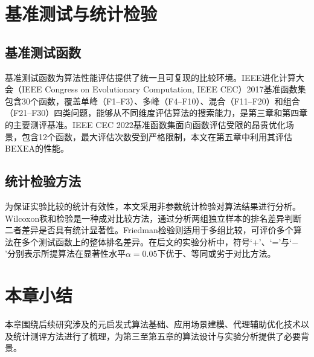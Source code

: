 \section{基准测试与统计检验}

\subsection{基准测试函数}

基准测试函数为算法性能评估提供了统一且可复现的比较环境\cite{ibsa_ref4}。IEEE进化计算大会（IEEE Congress on Evolutionary Computation, IEEE CEC）2017基准函数集包含30个函数，覆盖单峰（F1--F3）、多峰（F4--F10）、混合（F11--F20）和组合（F21--F30）四类问题\cite{ibsa_ref88}，能够从不同维度评估算法的搜索能力，是第三章和第四章的主要测评基准。IEEE CEC 2022基准函数集面向函数评估受限的昂贵优化场景，包含12个函数\cite{kumar2024optimization}，最大评估次数受到严格限制，本文在第五章中利用其评估BEXEA的性能。

\subsection{统计检验方法}
\label{sec:ch2_stat_tests}

为保证实验比较的统计有效性，本文采用非参数统计检验对算法结果进行分析。Wilcoxon秩和检验\cite{ibsa_ref95}是一种成对比较方法，通过分析两组独立样本的排名差异判断二者差异是否具有统计显著性。Friedman检验\cite{derrac2011practical}则适用于多组比较，可评价多个算法在多个测试函数上的整体排名差异。在后文的实验分析中，符号‘+’、‘=’与‘$-$’分别表示所提算法在显著性水平$\alpha = 0.05$下优于、等同或劣于对比方法。

\section{本章小结}

本章围绕后续研究涉及的元启发式算法基础、应用场景建模、代理辅助优化技术以及统计测评方法进行了梳理，为第三至第五章的算法设计与实验分析提供了必要背景。
